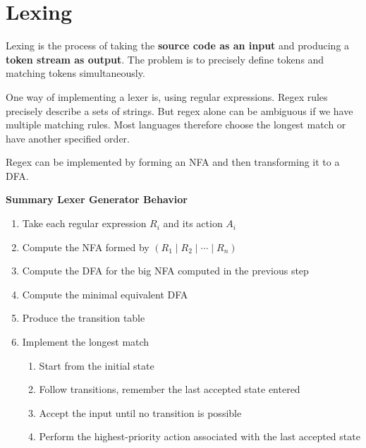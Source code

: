 \section*{Lexing}

Lexing is the process of taking the \textbf{source code as an input} and producing a \textbf{token stream as output}. The problem is to precisely define tokens and matching tokens simultaneously.\medskip

One way of implementing a lexer is, using regular expressions. Regex rules precisely describe a sets of strings. But regex alone can be ambiguous if we have multiple matching rules. Most languages therefore choose the longest match or have another specified order. \medskip

Regex can be implemented by forming an NFA and then transforming it to a DFA.

\textbf{Summary Lexer Generator Behavior}
\begin{enumerate}
    \item Take each regular expression $R_i$ and its action $A_i$
    \item Compute the NFA formed by $(R_1 \mid R_2 \mid \cdots \mid R_n)$
    \item Compute the DFA for the big NFA computed in the previous step
    \item Compute the minimal equivalent DFA
    \item Produce the transition table
    \item Implement the longest match
    \begin{enumerate}
        \item Start from the initial state
        \item Follow transitions, remember the last accepted state entered
        \item Accept the input until no transition is possible
        \item Perform the highest-priority action associated with the last accepted state
    \end{enumerate}
\end{enumerate}

